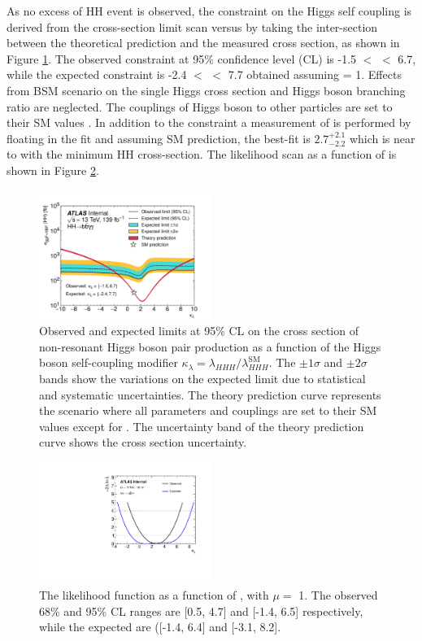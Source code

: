 As no excess of HH event is observed, the constraint on the Higgs self coupling is derived from the cross-section limit scan versus \kl by taking the inter-section between the theoretical prediction and the measured cross section, as shown in Figure \ref{fig:HHyybb:Results:Xsec:Limit}. The observed constraint at 95\% confidence level (CL) is -1.5 $<$ \kl $<$ 6.7, while the expected constraint is -2.4 $<$ \kl $<$ 7.7 obtained assuming \kl = 1. Effects from BSM scenario on the single Higgs cross section and Higgs boson branching ratio are neglected. The couplings of Higgs boson to other particles are set to their SM values \cite{Higgs_80ifb}. In addition to the constraint a measurement of \kl is performed by floating \kl in the fit and assuming SM prediction, the best-fit \kl is $2.7^{+2.1}_{-2.2}$ which is near to \kl with the minimum HH cross-section. The likelihood scan as a function of \kl is shown in Figure \ref{fig:HHyybb:Results:Xsec:LH}.
\begin{figure}[htbp]
    \centering
    \includegraphics[width=0.5\textwidth]{Ch5/Img/figures_Results_kappa_lambda_scan.pdf}
    \caption{Observed and expected limits at 95\% CL on the cross section of non-resonant Higgs boson pair production as a function of the Higgs boson self-coupling modifier $\kappa_{\lambda}= \lambda_{HHH}/\lambda^{\textrm{SM}}_{HHH}$. The $\pm 1\sigma$ and $\pm 2\sigma$ bands show the variations on the expected limit due to statistical and systematic uncertainties. The theory prediction curve represents the scenario where all parameters and couplings are set to their SM values except for \kl. The uncertainty band of the theory prediction curve shows the cross section uncertainty.}
    \label{fig:HHyybb:Results:Xsec:Limit}
\end{figure}

\begin{figure}[htbp]
    \centering
    \includegraphics[width=0.5\textwidth]{Ch5/Img/figures_Results_scan_hhyybb_kl.pdf}
    \caption{The likelihood function as a function of \kl, with $\mu = $  1. The observed 68\% and 95\% CL ranges are [0.5, 4.7] and [-1.4, 6.5] respectively, while the expected are ([-1.4, 6.4] and [-3.1, 8.2].}
    \label{fig:HHyybb:Results:Xsec:LH}
\end{figure}

